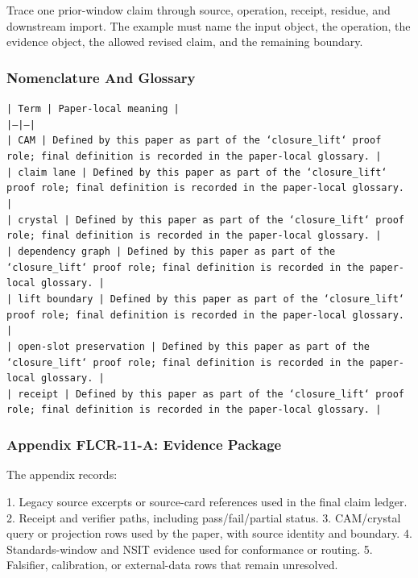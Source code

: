 \documentclass[11pt]{article}
\begin{document}
Trace one prior-window claim through source, operation, receipt, residue, and downstream import. The example must name the input object, the operation,
the evidence object, the allowed revised claim, and the remaining boundary.

\subsubsection*{Nomenclature And Glossary}

\noindent\texttt{| Term | Paper-local meaning |}\\
\noindent\texttt{|---|---|}\\
\noindent\texttt{| CAM | Defined by this paper as part of the `closure\_lift` proof role; final definition is recorded in the paper-local glossary. |}\\
\noindent\texttt{| claim lane | Defined by this paper as part of the `closure\_lift` proof role; final definition is recorded in the paper-local glossary. |}\\
\noindent\texttt{| crystal | Defined by this paper as part of the `closure\_lift` proof role; final definition is recorded in the paper-local glossary. |}\\
\noindent\texttt{| dependency graph | Defined by this paper as part of the `closure\_lift` proof role; final definition is recorded in the paper-local glossary. |}\\
\noindent\texttt{| lift boundary | Defined by this paper as part of the `closure\_lift` proof role; final definition is recorded in the paper-local glossary. |}\\
\noindent\texttt{| open-slot preservation | Defined by this paper as part of the `closure\_lift` proof role; final definition is recorded in the paper-local glossary. |}\\
\noindent\texttt{| receipt | Defined by this paper as part of the `closure\_lift` proof role; final definition is recorded in the paper-local glossary. |}\\

\subsubsection*{Appendix FLCR-11-A: Evidence Package}

The appendix records:

1. Legacy source excerpts or source-card references used in the final claim ledger.
2. Receipt and verifier paths, including pass/fail/partial status.
3. CAM/crystal query or projection rows used by the paper, with source identity and boundary.
4. Standards-window and NSIT evidence used for conformance or routing.
5. Falsifier, calibration, or external-data rows that remain unresolved.
\end{document}
